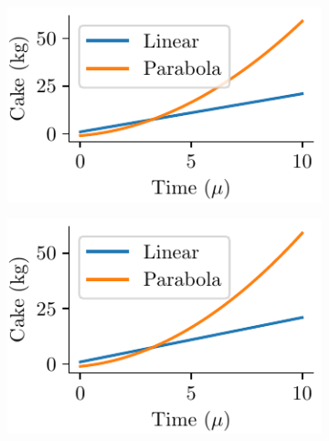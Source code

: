 \documentclass[a4paper,11pt]{report} %
\numberwithin{equation}{section}
\begin{document}
\begin{figure}
	\centering
	\begin{subfigure}{0.49\textwidth}
		\centering
		\includegraphics[width=1\linewidth]{fig/TwoGolden11.pdf}
		\caption{}
	\end{subfigure}
	\begin{subfigure}{0.49\textwidth}
		\centering
		\includegraphics[width=1\linewidth]{fig/TwoInnerGolden11.pdf}
		\caption{}
	\end{subfigure}
	\caption{}
\end{figure}
\end{document}
